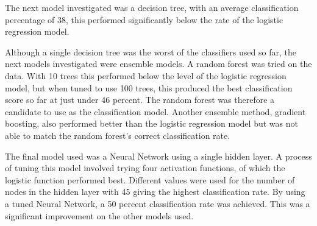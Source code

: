 The next model investigated was a decision tree, with an average classification percentage of 38, this performed significantly below the rate of the logistic regression model.

Although a single decision tree was the worst of the classifiers used so far, the next models investigated were ensemble models. A random forest was tried on the data. With 10 trees this performed below the level of the logistic regression model, but when tuned to use 100 trees, this produced the best classification score so far at just under 46 percent. The random forest was therefore a candidate to use as the classification model.
Another ensemble method, gradient boosting, also performed better than the logistic regression model but was not able to match the random forest's correct classification rate.

The final model used was a Neural Network using a single hidden layer. A process of tuning this model involved trying four activation functions, of which the logistic function performed best. Different values were used for the number of nodes in the hidden layer with 45 giving the highest classification rate.
By using a tuned Neural Network, a 50 percent classification rate was achieved. This was a significant improvement on the other models used.

